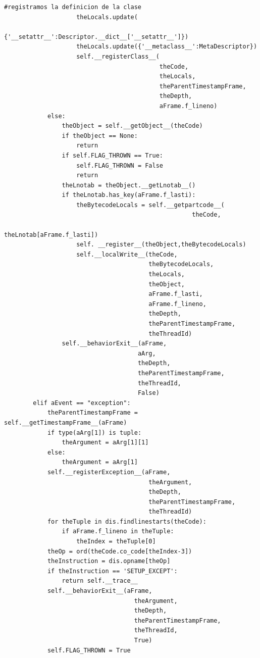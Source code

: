 \documentclass[12pt,legalpaper]{report}
\begin{document}
\begin{singlespace}
\begin{lstlisting}[style=Python]
                    #registramos la definicion de la clase
                    theLocals.update(
                            {'__setattr__':Descriptor.__dict__['__setattr__']})
                    theLocals.update({'__metaclass__':MetaDescriptor})
                    self.__registerClass__(
                                           theCode,
                                           theLocals,
                                           theParentTimestampFrame,
                                           theDepth,
                                           aFrame.f_lineno)
            else:
                theObject = self.__getObject__(theCode)
                if theObject == None:
                    return
                if self.FLAG_THROWN == True:
                    self.FLAG_THROWN = False
                    return
                theLnotab = theObject.__getLnotab__()
                if theLnotab.has_key(aFrame.f_lasti):
                    theBytecodeLocals = self.__getpartcode__(
                                                    theCode,
                                                    theLnotab[aFrame.f_lasti])
                    self. __register__(theObject,theBytecodeLocals)
                    self.__localWrite__(theCode,
                                        theBytecodeLocals,
                                        theLocals,
                                        theObject,
                                        aFrame.f_lasti,
                                        aFrame.f_lineno,
                                        theDepth,
                                        theParentTimestampFrame,
                                        theThreadId)
                self.__behaviorExit__(aFrame,
                                     aArg,
                                     theDepth,
                                     theParentTimestampFrame,
                                     theThreadId,
                                     False)
        elif aEvent == "exception":
            theParentTimestampFrame = self.__getTimestampFrame__(aFrame)
            if type(aArg[1]) is tuple:
                theArgument = aArg[1][1]
            else:
                theArgument = aArg[1]
            self.__registerException__(aFrame,
                                        theArgument,
                                        theDepth,
                                        theParentTimestampFrame,
                                        theThreadId)
            for theTuple in dis.findlinestarts(theCode):
                if aFrame.f_lineno in theTuple:
                    theIndex = theTuple[0]
            theOp = ord(theCode.co_code[theIndex-3])
            theInstruction = dis.opname[theOp]
            if theInstruction == 'SETUP_EXCEPT':
                return self.__trace__
            self.__behaviorExit__(aFrame,
                                    theArgument,
                                    theDepth,
                                    theParentTimestampFrame,
                                    theThreadId,
                                    True)
            self.FLAG_THROWN = True           


\end{lstlisting}
\end{singlespace}
\end{document}
